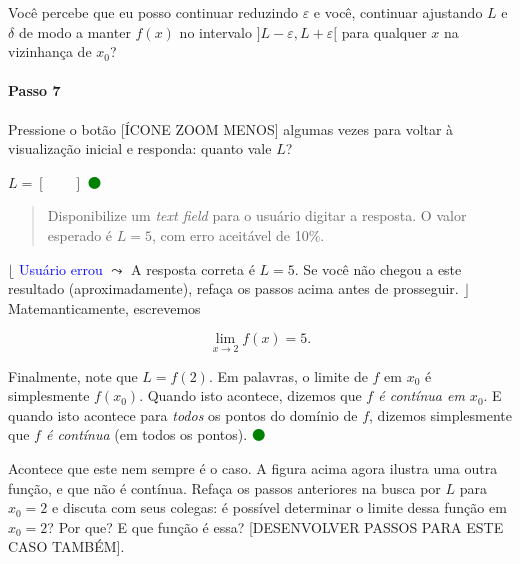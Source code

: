 \documentclass[fleqn,12pt]{article}
\newenvironment{ct}{\begin{quotation}\color{red!30!black}\sffamily\small}{\end{quotation}} %
\newcommand\foreign[1]{\textsl{#1}}
\newcommand\proceed{\textcolor{green}{$\medbullet$}\xspace}
\newcommand\condicional[2]{$\lfloor$%
	\textsf{\textcolor{blue}{{\footnotesize #1}}}
	$\leadsto$ #2%
	$\rfloor$}
\begin{document}
    Você percebe que eu posso continuar reduzindo $\varepsilon$ e você, continuar ajustando $L$ e $\delta$ de modo a manter $f(x)$ no intervalo $]L - \varepsilon, L + \varepsilon[$ para qualquer $x$ na vizinhança de $x_0$?

    \paragraph{Passo 7} Pressione o botão [ÍCONE ZOOM MENOS] algumas vezes para voltar à visualização inicial e responda: quanto vale $L$?

    $L = [\qquad]$ \proceed

    \begin{ct}
	Disponibilize um \foreign{text field} para o usuário digitar a resposta. O valor esperado é $L = 5$, com erro aceitável de 10\%.
    \end{ct}

    \condicional{Usuário errou}{A resposta correta é $L = 5$. Se você não chegou a este resultado (aproximadamente), refaça os passos acima antes de prosseguir.} Matemanticamente, escrevemos

    \begin{equation*}
	\lim_{x  \to 2} f(x) = 5.
    \end{equation*}

    Finalmente, note que $L = f(2)$. Em palavras, o limite de $f$ em $x_0$ é simplesmente $f(x_0)$. Quando isto acontece, dizemos que \emph{$f$ é contínua em $x_0$}. E quando isto acontece para \emph{todos} os pontos do domínio de $f$, dizemos simplesmente que \emph{$f$ é contínua} (em todos os pontos). \proceed

    Acontece que este nem sempre é o caso. A figura acima agora ilustra uma outra função, e que não é contínua. Refaça os passos anteriores na busca por $L$ para $x_0 = 2$ e discuta com seus colegas: é possível determinar o limite dessa função em $x_0 = 2$? Por que? E que função é essa? [DESENVOLVER PASSOS PARA ESTE CASO TAMBÉM].
\end{document}
